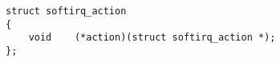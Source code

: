 
\begin{lstlisting}
struct softirq_action
{
	void	(*action)(struct softirq_action *);
};
\end{lstlisting}
